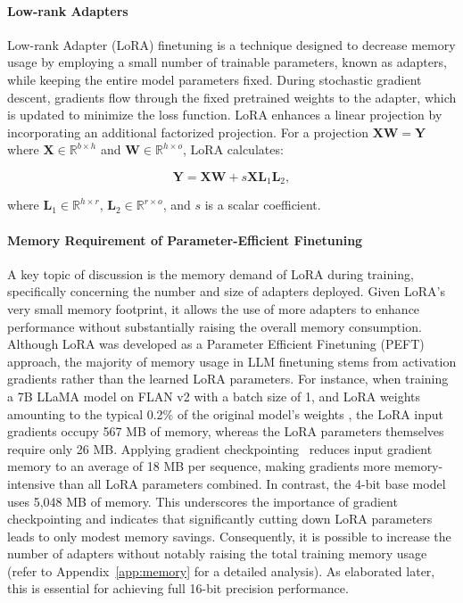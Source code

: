 \paragraph{Low-rank Adapters} Low-rank Adapter (LoRA) finetuning \citep{hu2021lora} is a technique designed to decrease memory usage by employing a small number of trainable parameters, known as adapters, while keeping the entire model parameters fixed. During stochastic gradient descent, gradients flow through the fixed pretrained weights to the adapter, which is updated to minimize the loss function. LoRA enhances a linear projection by incorporating an additional factorized projection. For a projection ${\mathbf{X} \mathbf{W} = \mathbf{Y}}$ where $\mathbf{X}\in  \mathbb{R}^{b\times h}$ and $\mathbf{W}\in  \mathbb{R}^{h\times o}$, LoRA calculates:

\begin{equation}
    \mathbf{Y} = \mathbf{X}\mathbf{W} + s\mathbf{X}\mathbf{L}_1\mathbf{L}_2,
\end{equation}

where $\mathbf{L}_1\in  \mathbb{R}^{h\times r}$, $\mathbf{L}_2\in  \mathbb{R}^{r\times o}$, and $s$ is a scalar coefficient.

\paragraph{Memory Requirement of Parameter-Efficient Finetuning} A key topic of discussion is the memory demand of LoRA during training, specifically concerning the number and size of adapters deployed. Given LoRA's very small memory footprint, it allows the use of more adapters to enhance performance without substantially raising the overall memory consumption. Although LoRA was developed as a Parameter Efficient Finetuning (PEFT) approach, the majority of memory usage in LLM finetuning stems from activation gradients rather than the learned LoRA parameters. For instance, when training a 7B LLaMA model on FLAN v2 with a batch size of 1, and LoRA weights amounting to the typical 0.2\% of the original model's weights \citep{hu2021lora,liu2022few}, the LoRA input gradients occupy 567 MB of memory, whereas the LoRA parameters themselves require only 26 MB. Applying gradient checkpointing~\citep{chen2016training} reduces input gradient memory to an average of 18 MB per sequence, making gradients more memory-intensive than all LoRA parameters combined. In contrast, the 4-bit base model uses 5,048 MB of memory. This underscores the importance of gradient checkpointing and indicates that significantly cutting down LoRA parameters leads to only modest memory savings. Consequently, it is possible to increase the number of adapters without notably raising the total training memory usage (refer to Appendix~\ref{app:memory} for a detailed analysis). As elaborated later, this is essential for achieving full 16-bit precision performance.

